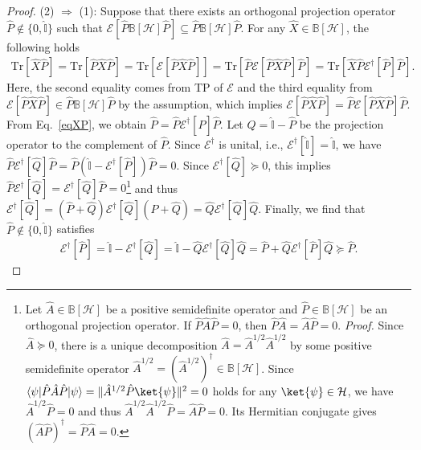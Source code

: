 \documentclass[preprint,pteplogo]{ptephy_v2}%
\numberwithin{equation}{section}
\theoremstyle{definition}
\newcommand{\mc}[1]{\mathcal{#1}}
\newcommand{\mr}[1]{\mathrm{#1}}
\newcommand{\mbb}[1]{\mathbb{#1}}
\newcommand{\Tr}{\mr{Tr}}
\begin{document}
\begin{proof}
(2) $\Rightarrow$ (1):
Suppose that there exists an orthogonal projection operator $\hat{P} \notin \{ 0, \hat{\mbb{I}} \}$ such that $\mc{E}[\hat{P} \mbb{B}[\mc{H}] \hat{P}] \subseteq \hat{P} \mbb{B}[\mc{H}] \hat{P}$.
For any $\hat{X} \in \mbb{B}[\mc{H}]$, the following holds
\begin{align}\label{eqXP}
\Tr[\hat{X} \hat{P}] 
= \Tr[\hat{P} \hat{X} \hat{P}] 
= \Tr[\mc{E}[\hat{P} \hat{X} \hat{P}]]
= \Tr[\hat{P} \mc{E}[\hat{P} \hat{X} \hat{P}] \hat{P}]
= \Tr[\hat{X} \hat{P} \mc{E}^\dagger[\hat{P}] \hat{P}].
\end{align}
Here, the second equality comes from TP of $\mc{E}$ and the third equality from $\mc{E}[\hat{P} \hat{X} \hat{P}] \in \hat{P} \mbb{B}[\mc{H}] \hat{P}$ by the assumption, which implies $\mc{E}[\hat{P} \hat{X} \hat{P}] = \hat{P} \mc{E}[\hat{P} \hat{X} \hat{P}] \hat{P}$.
From Eq.~\eqref{eqXP}, we obtain $\hat{P} = \hat{P} \mc{E}^\dagger[\hat{P}] \hat{P}$. 
Let $\hat{Q} = \hat{\mbb{I}}-\hat{P}$ be the projection operator to the complement of $\hat{P}$.
Since $\mc{E}^\dagger$ is unital, i.e., $\mc{E}^\dagger[\hat{\mbb{I}}]=\hat{\mbb{I}}$, we have $\hat{P} \mc{E}^\dagger[\hat{Q}] \hat{P} = \hat{P} (\hat{\mbb{I}}-\mc{E}^\dagger[\hat{P}]) \hat{P} = 0$.
Since $\mc{E}^\dagger[\hat{Q}] \succeq 0$, 
this implies $\hat{P} \mc{E}^\dagger[\hat{Q}] = \mc{E}^\dagger[\hat{Q}] \hat{P} = 0$\footnote{
Let $\hat{A} \in \mbb{B}[\mc{H}]$ be a positive semidefinite operator and $\hat{P} \in \mbb{B}[\mc{H}]$ be an orthogonal projection operator. 
If $\hat{P} \hat{A} \hat{P}=0$, then $\hat{P} \hat{A} = \hat{A} \hat{P} = 0$. 
\textit{Proof.} Since $\hat{A} \succeq 0$, there is a unique decomposition $\hat{A} = \hat{A}^{1/2} \hat{A}^{1/2}$ by some positive semidefinite operator $\hat{A}^{1/2} = (\hat{A}^{1/2})^\dagger \in \mbb{B}[\mc{H}]$.
Since $\langle \psi | \hat{P} \hat{A} \hat{P} | \psi \rangle = \| \hat{A}^{1/2} \hat{P} \ket{\psi} \|^2 = 0$ holds for any $\ket{\psi} \in \mc{H}$, we have $\hat{A}^{1/2} \hat{P} = 0$ and thus $\hat{A}^{1/2} \hat{A}^{1/2} \hat{P} = \hat{A} \hat{P} = 0$. 
Its Hermitian conjugate gives $(\hat{A} \hat{P})^\dagger = \hat{P} \hat{A} = 0$.
} and thus $\mc{E}^\dagger[\hat{Q}] = (\hat{P}+\hat{Q}) \mc{E}^\dagger[\hat{Q}] (\hat{P}+\hat{Q}) = \hat{Q} \mc{E}^\dagger[\hat{Q}] \hat{Q}$.
Finally, we find that $\hat{P} \notin \{ 0, \hat{\mbb{I}} \}$ satisfies
\begin{align}
\mc{E}^\dagger[\hat{P}] = \hat{\mbb{I}} -\mc{E}^\dagger[\hat{Q}] = \hat{\mbb{I}} -\hat{Q} \mc{E}^\dagger[\hat{Q}] \hat{Q} = \hat{P} + \hat{Q} \mc{E}^\dagger[\hat{P}] \hat{Q} \succeq \hat{P}.
\end{align}


\end{proof}
\end{document}
